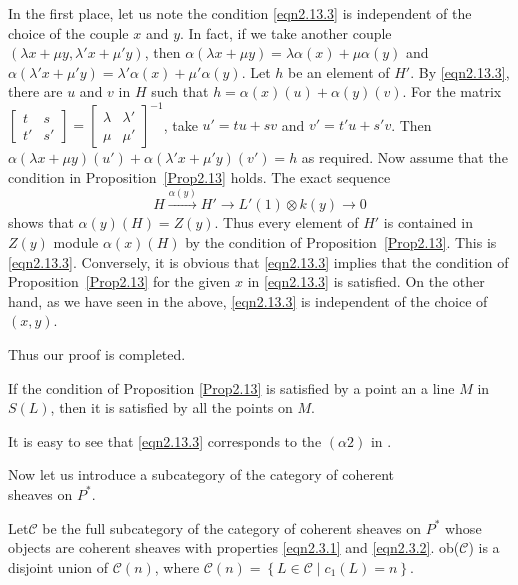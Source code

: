 \begin{Proof}
In the first place, let us note the condition \ref{eqn2.13.3} is\pageoriginale
independent of the choice of the couple $x$ and $y$. In fact, if we
take another couple $(\lambda x+\mu y, \lambda'x+\mu'y)$, then
$\alpha(\lambda x+\mu y)=\lambda \alpha(x)+\mu \alpha(y)$  and
$\alpha(\lambda'x+\mu'y)=\lambda'\alpha(x)+\mu'\alpha(y)$. Let $h$ be
an element of $H'$. By \ref{eqn2.13.3}, there are $u$ and $v$ in $H$
such that $h=\alpha(x)(u)+\alpha(y)(v)$. For the matrix
$\left[\begin{smallmatrix}
t & s\\
t'& s'
\end{smallmatrix}\right]=\left[\begin{smallmatrix}
\lambda &\lambda'\\
\mu & \mu'
\end{smallmatrix}\right]^{-1}$, take $u'=tu+sv$ and $v'=t'u+s'v$. Then
$\alpha(\lambda x+\mu y) (u')+\alpha(\lambda'x+\mu'y)(v')=h$ as
required. Now assume that the condition in Proposition~\ref{Prop2.13}
holds. The exact sequence 
$$
H\xrightarrow{\alpha(y)} H'\to L'(1)\otimes k(y)\to 0
$$
shows that $\alpha(y)(H)=Z(y)$. Thus every element of $H'$ is
contained in $Z(y)$ module $\alpha(x)(H)$ by the condition of
Proposition~\ref{Prop2.13}. This is \ref{eqn2.13.3}. Conversely, it
is obvious that \ref{eqn2.13.3} implies that the condition of
Proposition~\ref{Prop2.13} for the given $x$ in \ref{eqn2.13.3} is
satisfied. On the other hand, as we have seen in the above,
\ref{eqn2.13.3} is independent of the choice of $(x,y)$.

Thus our proof is completed.
\enprf
\end{Proof}

\setcounter{cor}{3}
\begin{cor}
If the condition of Proposition \ref{Prop2.13} is satisfied by a point
an a line $M$ in $S(L)$, then it is satisfied by all the points on $M$.
\end{cor}

\begin{Remark}\label{Remark2.14}
It is easy to see that \ref{eqn2.13.3} corresponds to the $(\alpha 2)$
in \cite{key2}.

Now let us introduce a subcategory of the category of coherent\\ sheaves
on $P^{\ast}$.
\end{Remark}

\begin{dfn}\label{dfn2.15}
Let\pageoriginale $\mathscr{C}$ be the full subcategory of the
category of coherent sheaves on $P^{\ast}$ whose objects are coherent
sheaves with properties \eqref{eqn2.3.1}
and \eqref{eqn2.3.2}. ob($\mathscr{C}$) is a disjoint union of
$\mathscr{C}(n)$, where $\mathscr{C}(n)=\left\{L\in \mathscr{C}\mid
c_1(L)=n\right\}$.  
\end{dfn}

